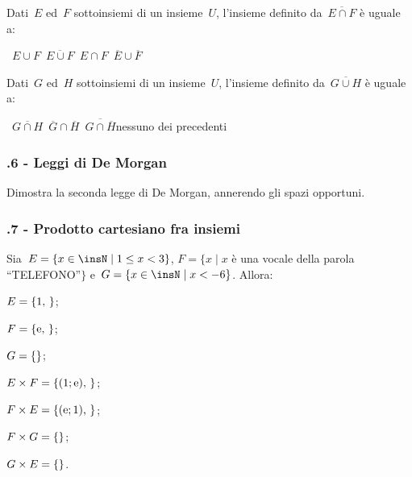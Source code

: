 \begin{esercizio}
 \label{ese:7.16}
Dati~$E$ ed~$F$ sottoinsiemi di un insieme~$U$, l'insieme
definito da~$\overline{E\cap F}$ è uguale a:
\begin{center}
\boxA\quad~$E\cup F$\quad\boxB\quad~$\overline{E\cup F}$\quad\boxC\quad~$E\cap F$\quad\boxD\quad~$\overline{E}\cup\overline{F}$
\end{center}
\end{esercizio}

\begin{esercizio}
 \label{ese:7.17}
Dati~$G$ ed~$H$ sottoinsiemi di un insieme~$U$, l'insieme
definito da~$\overline{G\cup H}$ è uguale a:
\begin{center}
\boxA\quad~$\overline{G\cap H}$\quad\boxB\quad~$\overline{G}\cap\overline{H}$\quad\boxC\quad~$\overline{G\cap \overline{H}}$\quad\boxD\quad nessuno dei precedenti
\end{center}
\end{esercizio}

\subsubsection*{\thechapter.6 - Leggi di De Morgan}

\begin{esercizio}
 \label{ese:7.18}
 Dimostra la seconda legge di De Morgan, annerendo gli spazi opportuni.
 \begin{center}
 
 \end{center}
\end{esercizio}

\subsubsection*{\thechapter.7 - Prodotto cartesiano fra insiemi}

\begin{esercizio}
\label{ese:7.19}
Sia~$E=\{x\in\insN\mid 1\le x<3\}$, $F=\{x\mid x$ è una vocale della parola ``TELEFONO''$\}$ e~$G=\{x\in\insN\mid x<-6\}$. Allora:
\begin{enumeratea}
 \item $E=\{1\text{, }\dotfill\}$;
 \item $F=\{\text{e, }\dotfill\}$;
 \item $G=\{\dotfill\}$;
 \item $E\times F=\{(1;\text{e})\text{, }\dotfill\}$;
 \item $F\times E=\{(\text{e};1)\text{, }\dotfill\}$;
 \item $F\times G=\{\dotfill\}$;
 \item $G\times E=\{\dotfill\}$.
\end{enumeratea}
\end{esercizio}

